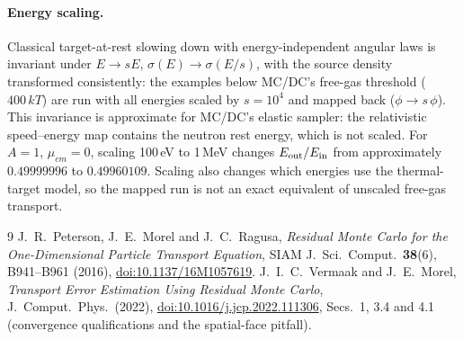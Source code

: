 \documentclass[11pt]{article}
\begin{document}
\paragraph{Energy scaling.} Classical target-at-rest slowing down with
energy-independent angular laws is invariant under $E\to sE$,
$\sigma(E)\to\sigma(E/s)$, with the source density transformed consistently: the examples
below MC/DC's free-gas threshold ($400\,kT$) are run with all energies scaled by
$s=10^4$ and mapped back ($\phi\to s\,\phi$).
This invariance is approximate for MC/DC's elastic sampler: the relativistic
speed--energy map contains the neutron rest energy, which is not scaled.
For $A=1$, $\mu_{cm}=0$, scaling 100\,eV to 1\,MeV changes $E_{\rm out}/E_{\rm in}$
from approximately $0.49999996$ to $0.49960109$. Scaling also changes which energies
use the thermal-target model, so the mapped run is not an exact equivalent of
unscaled free-gas transport.

\begin{thebibliography}{9}
 J.~R.~Peterson, J.~E.~Morel and J.~C.~Ragusa,
  \emph{Residual Monte Carlo for the One-Dimensional Particle Transport Equation},
  SIAM J.\ Sci.\ Comput.\ \textbf{38}(6), B941--B961 (2016),
  \href{https://doi.org/10.1137/16M1057619}{doi:10.1137/16M1057619}.
 J.~I.~C.~Vermaak and J.~E.~Morel,
  \emph{Transport Error Estimation Using Residual Monte Carlo},
  J.\ Comput.\ Phys.\ (2022),
  \href{https://doi.org/10.1016/j.jcp.2022.111306}{doi:10.1016/j.jcp.2022.111306},
  Secs.~1, 3.4 and 4.1 (convergence qualifications and the spatial-face pitfall).
\end{thebibliography}
\end{document}
